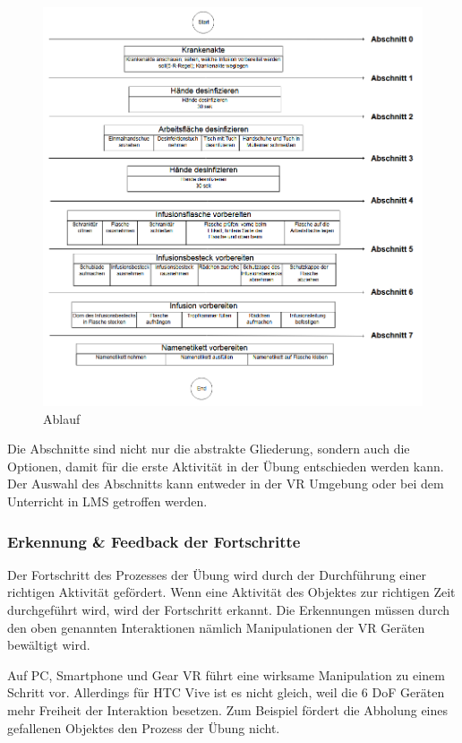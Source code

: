   \begin{figure}[ht]
  \begin{minipage}[t]{1\linewidth}
  \centering
  \includegraphics[width=\textwidth]{images/AblaufInfusionsvorbereitung.png}
  \caption[Skillslab WebVR]{Ablauf}
  \end{minipage}
  \end{figure}
  
  Die Abschnitte sind nicht nur die abstrakte Gliederung, sondern auch die Optionen, damit für die erste Aktivität in der Übung entschieden werden kann. Der Auswahl des Abschnitts kann entweder in der VR Umgebung oder bei dem Unterricht in LMS getroffen werden.
  
  \subsubsection{Erkennung \& Feedback der Fortschritte}
  Der Fortschritt des Prozesses der Übung wird durch der Durchführung einer richtigen Aktivität gefördert. Wenn eine Aktivität des Objektes zur richtigen Zeit durchgeführt wird, wird der Fortschritt erkannt. Die Erkennungen müssen durch den oben genannten Interaktionen nämlich Manipulationen der VR Geräten bewältigt wird.
  
  Auf PC, Smartphone und Gear VR führt eine wirksame Manipulation zu einem Schritt vor. Allerdings für HTC Vive ist es nicht gleich, weil die 6 DoF Geräten mehr Freiheit der Interaktion besetzen. Zum Beispiel fördert die Abholung eines gefallenen Objektes den Prozess der Übung nicht. 
  
